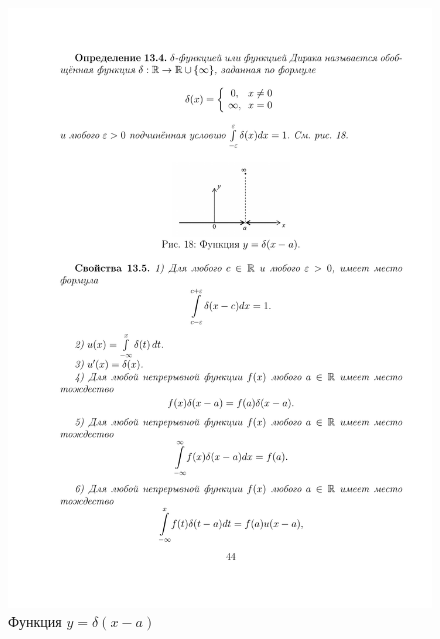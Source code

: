 \begin{figure}[H]
	\centering
	\includegraphics[]{pic/pic18}
	\caption{Функция $y=\delta(x-a)$}
	\label{fig18}
\end{figure}

